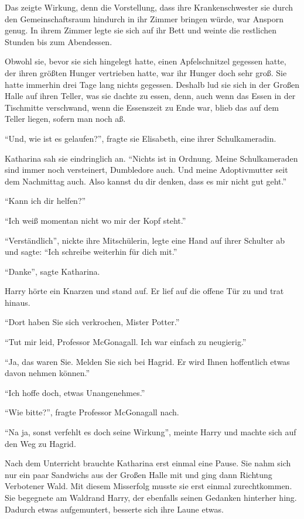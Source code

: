Das zeigte Wirkung, denn die Vorstellung, dass ihre Krankenschwester sie durch den Gemeinschaftsraum hindurch in ihr Zimmer bringen würde, war Ansporn genug. In ihrem Zimmer legte sie sich auf ihr Bett und weinte die restlichen Stunden bis zum Abendessen.

Obwohl sie, bevor sie sich hingelegt hatte, einen Apfelschnitzel gegessen hatte, der ihren größten Hunger vertrieben hatte, war ihr Hunger doch sehr groß. Sie hatte immerhin drei Tage lang nichts gegessen. Deshalb lud sie sich in der Großen Halle auf ihren Teller, was sie dachte zu essen, denn, auch wenn das Essen in der Tischmitte verschwand, wenn die Essenszeit zu Ende war, blieb das auf dem Teller liegen, sofern man noch aß.

\enquote{Und, wie ist es gelaufen?}, fragte sie Elisabeth, eine ihrer Schulkameradin.

Katharina sah sie eindringlich an. \enquote{Nichts ist in Ordnung. Meine Schulkameraden sind immer noch versteinert, Dumbledore auch. Und meine Adoptivmutter seit dem Nachmittag auch. Also kannst du dir denken, dass es mir nicht gut geht.}

\enquote{Kann ich dir helfen?}

\enquote{Ich weiß momentan nicht wo mir der Kopf steht.}

\enquote{Verständlich}, nickte ihre Mitschülerin, legte eine Hand auf ihrer Schulter ab und sagte: \enquote{Ich schreibe weiterhin für dich mit.}

\enquote{Danke}, sagte Katharina.

\trenn

Harry hörte ein Knarzen und stand auf. Er lief auf die offene Tür zu und trat hinaus.

\enquote{Dort haben Sie sich verkrochen, Mister Potter.}

\enquote{Tut mir leid, Professor McGonagall. Ich war einfach zu neugierig.}

\enquote{Ja, das waren Sie. Melden Sie sich bei Hagrid. Er wird Ihnen hoffentlich etwas davon nehmen können.}

\enquote{Ich hoffe doch, etwas Unangenehmes.}

\enquote{Wie bitte?}, fragte Professor McGonagall nach.

\enquote{Na ja, sonst verfehlt es doch seine Wirkung}, meinte Harry und machte sich auf den Weg zu Hagrid.

Nach dem Unterricht brauchte Katharina erst einmal eine Pause. Sie nahm sich nur ein paar Sandwichs aus der Großen Halle mit und ging dann Richtung Verbotener Wald. Mit diesem Misserfolg musste sie erst einmal zurechtkommen. Sie begegnete am Waldrand Harry, der ebenfalls seinen Gedanken hinterher hing. Dadurch etwas aufgemuntert, besserte sich ihre Laune etwas.

